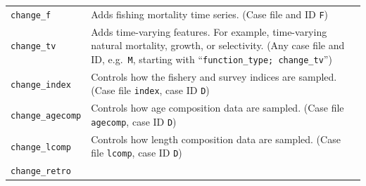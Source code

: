 \documentclass[11pt]{article}
\begin{document}
\begin{small}
\begin{longtable}[c]{@{}ll@{}}
\begin{minipage}[t]{0.32\columnwidth}
\texttt{change\_f}
\end{minipage} & \begin{minipage}[t]{0.57\columnwidth}\raggedright
Adds fishing mortality time series. (Case file and ID \texttt{F})
\end{minipage}
\\\noalign{\medskip}
\begin{minipage}[t]{0.32\columnwidth}\raggedright
\texttt{change\_tv}
\end{minipage} & \begin{minipage}[t]{0.57\columnwidth}\raggedright
Adds time-varying features. For example, time-varying natural mortality, growth, or selectivity. (Any case file and ID, e.g.~\texttt{M}, starting with ``\texttt{function\_type; change\_tv}'')
\end{minipage}
\\\noalign{\medskip}
\begin{minipage}[t]{0.32\columnwidth}\raggedright
\texttt{change\_index}
\end{minipage} & \begin{minipage}[t]{0.57\columnwidth}\raggedright
Controls how the fishery and survey indices are sampled. (Case file \texttt{index}, case ID \texttt{D})
\end{minipage}
\\\noalign{\medskip}
\begin{minipage}[t]{0.32\columnwidth}\raggedright
\texttt{change\_agecomp}
\end{minipage} & \begin{minipage}[t]{0.57\columnwidth}\raggedright
Controls how age composition data are sampled. (Case file \texttt{agecomp}, case ID \texttt{D})
\end{minipage}
\\\noalign{\medskip}
\begin{minipage}[t]{0.32\columnwidth}\raggedright
\texttt{change\_lcomp}
\end{minipage} & \begin{minipage}[t]{0.57\columnwidth}\raggedright
Controls how length composition data are sampled. (Case file \texttt{lcomp}, case ID \texttt{D})
\end{minipage}
\\\noalign{\medskip}
\begin{minipage}[t]{0.32\columnwidth}\raggedright
\texttt{change\_retro}
\end{minipage} & \begin{minipage}[t]{0.57\columnwidth}\raggedright

\end{minipage}
\end{longtable}
\end{small}
\end{document}
